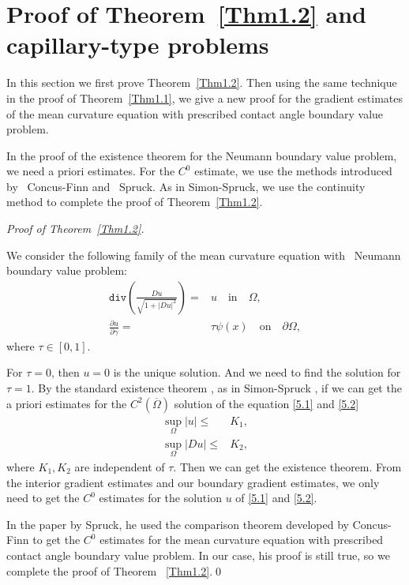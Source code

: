 \documentclass[11pt]{amsart}
\numberwithin{equation}{section}
\begin{document}
\section{  Proof of Theorem~\ref{Thm1.2} and capillary-type problems }

In this section we first prove  Theorem~\ref{Thm1.2}.  Then using the same technique in the proof of Theorem~\ref{Thm1.1}, we  give a new proof for the gradient estimates of the mean curvature equation with prescribed contact angle boundary value problem.



  In the proof of the existence theorem for the Neumann boundary value problem, we need  a priori estimates. For the $C^0$ estimate, we use the methods introduced by ~Concus-Finn\cite{CF74} and ~Spruck\cite{Sp75}. As in  Simon-Spruck\cite{SS76}, we use the continuity method to complete the proof of Theorem~\ref{Thm1.2}.


{\em Proof of  Theorem~\ref{Thm1.2}.}

We consider the following family of the mean curvature equation with ~Neumann boundary value problem:
\begin{align}
\texttt{div}(\frac{Du}{\sqrt{1+|Du|^2}}) =&u   \quad\text{in}\quad\Omega,\label{5.1} \\
              \frac{\partial u}{\partial \gamma} =&\tau\psi(x)  \quad\text{on}\quad \partial \Omega,\label{5.2}
\end{align}
where $\tau\in[0,1]$.

For
$\tau=0$, then  $u=0$ is the unique solution. And we need to find the solution for
$\tau=1.$
By the standard existence  theorem \cite{Ur73, LU68}, as in Simon-Spruck \cite{SS76}, if we can get the a priori estimates for the $C^2(\overline\Omega)$ solution of the equation  \eqref{5.1} and \eqref{5.2}
\begin{align}
\sup_{\Omega}|u|\leq& K_1,\label{5.3}\\
\sup_{\Omega}|Du|\leq& K_2,\label{5.4}
\end{align}
where $K_1, K_2$  are independent of $\tau$.
Then we can get the existence theorem. From the interior gradient estimates and our boundary gradient estimates, we only need to get the $C^0$ estimates for the solution $u$ of  \eqref{5.1} and \eqref{5.2}.

In the paper by  Spruck\cite{Sp75}, he used the comparison theorem developed by Concus-Finn\cite{CF74} to get the $C^0$ estimates for the mean curvature equation with prescribed contact angle boundary value problem. In our case, his proof is still true,
 so we complete the proof of Theorem ~\ref{Thm1.2}.\qed
\end{document}
